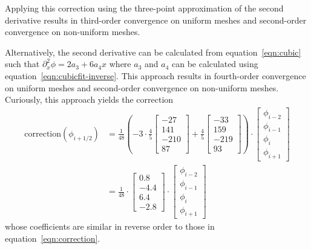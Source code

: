 \documentclass{article}
\begin{document}
Applying this correction using the three-point approximation of the second derivative results in third-order convergence on uniform meshes and second-order convergence on non-uniform meshes.

Alternatively, the second derivative can be calculated from equation~\eqref{eqn:cubic} such that $\partial_x^2 \phi = 2a_3 + 6a_4x$ where $a_3$ and $a_4$ can be calculated using equation~\eqref{eqn:cubicfit-inverse}.  This approach results in fourth-order convergence on uniform meshes and second-order convergence on non-uniform meshes.
Curiously, this approach yields the correction
\begin{align}
	\mathrm{correction}(\phi_{i+1/2})
	&=
	\frac{1}{48}
	\left(
	-3
	\cdot
	\frac{4}{5} 
	\begin{bmatrix}
		-27 \\ 141 \\ -210 \\ 87
	\end{bmatrix}
	+
	\frac{4}{5}
	\begin{bmatrix}
		-33 \\ 159 \\ -219 \\ 93
	\end{bmatrix}
	\right)
	\cdot
	\begin{bmatrix}
		\phi_{i-2} \\
		\phi_{i-1} \\
		\phi_i \\
		\phi_{i+1}
	\end{bmatrix} \\
	&=
	\frac{1}{48}
	\cdot
	\begin{bmatrix}
		0.8 \\ -4.4 \\ 6.4 \\ -2.8
	\end{bmatrix}
	\cdot
	\begin{bmatrix}
		\phi_{i-2} \\
		\phi_{i-1} \\
		\phi_i \\
		\phi_{i+1}
	\end{bmatrix}
\end{align}
whose coefficients are similar in reverse order to those in equation~\ref{eqn:correction}.




\end{document}
